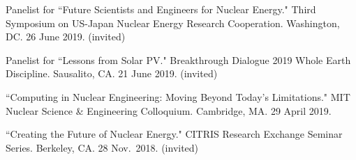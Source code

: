 \begin{bibsection}

\item Panelist for ``Future Scientists and Engineers for Nuclear Energy." Third Symposium on US-Japan Nuclear Energy Research Cooperation. Washington, DC. 26 June 2019. (invited)

\item Panelist for ``Lessons from Solar PV." Breakthrough Dialogue 2019 Whole Earth Discipline. Sausalito, CA. 21 June 2019. (invited)




\item ``Computing in Nuclear Engineering: Moving Beyond Today's Limitations." MIT Nuclear Science \& Engineering Colloquium. Cambridge, MA. 29 April 2019.



\item ``Creating the Future of Nuclear Energy." CITRIS Research Exchange Seminar Series. Berkeley, CA. 28 Nov.\ 2018. (invited)




\end{bibsection}
